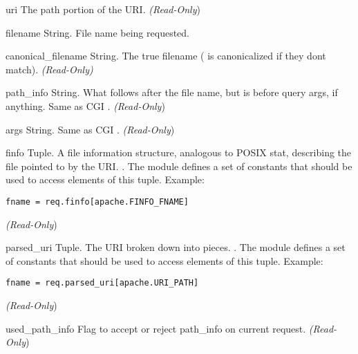 \begin{memberdesc}[request]{uri}
The path portion of the URI.
\emph{(Read-Only})
\end{memberdesc}

\begin{memberdesc}[request]{filename}
String. File name being requested.
\end{memberdesc}

\begin{memberdesc}[request]{canonical_filename}
String. The true filename ( is canonicalized if
they dont match).  \emph{(Read-Only)}
\end{memberdesc}

\begin{memberdesc}[request]{path_info}
String. What follows after the file name, but is before query args, if
anything. Same as CGI .
\emph{(Read-Only})
\end{memberdesc}

\begin{memberdesc}[request]{args}
String. Same as CGI .
\emph{(Read-Only})
\end{memberdesc}

\begin{memberdesc}[request]{finfo}
Tuple. A file information structure, analogous to POSIX stat,
describing the file pointed to by the URI.  . The  module defines a set of 
constants that should be used to access elements of this
tuple. Example:
\begin{verbatim}
fname = req.finfo[apache.FINFO_FNAME]
\end{verbatim}
\emph{(Read-Only})
\end{memberdesc}

\begin{memberdesc}[request]{parsed_uri}
Tuple. The URI broken down into pieces.
. 
The  module defines a set of  constants that
should be used to access elements of this tuple. Example:
\begin{verbatim}
fname = req.parsed_uri[apache.URI_PATH]
\end{verbatim}
\emph{(Read-Only})
\end{memberdesc}

\begin{memberdesc}[request]{used_path_info}
Flag to accept or reject path_info on current request.
\emph{(Read-Only})
\end{memberdesc}

